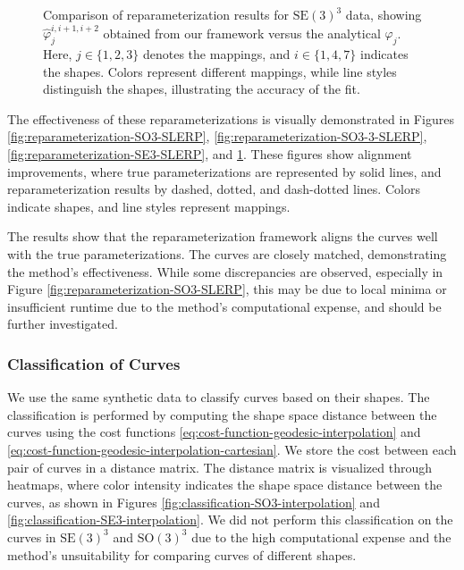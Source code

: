 \begin{figure}[!ht]
    \caption[Reparameterization of Curves in \(\mathrm{SE}(3)^3\)]{Comparison of reparameterization results for \(\mathrm{SE}(3)^3\) data, showing \(\hat{\varphi}_j^{i,i+1,i+2}\) obtained from our framework versus the analytical \(\varphi_j\). Here, \(j \in \{1, 2, 3\}\) denotes the mappings, and \(i \in \{1, 4, 7\}\) indicates the shapes. Colors represent different mappings, while line styles distinguish the shapes, illustrating the accuracy of the fit.}
    \label{fig:reparameterization-SE3-3-SLERP}
\end{figure}

The effectiveness of these reparameterizations is visually demonstrated in Figures \ref{fig:reparameterization-SO3-SLERP}, \ref{fig:reparameterization-SO3-3-SLERP}, \ref{fig:reparameterization-SE3-SLERP}, and \ref{fig:reparameterization-SE3-3-SLERP}. These figures show alignment improvements, where true parameterizations are represented by solid lines, and reparameterization results by dashed, dotted, and dash-dotted lines. Colors indicate shapes, and line styles represent mappings.

The results show that the reparameterization framework aligns the curves well with the true parameterizations. The curves are closely matched, demonstrating the method's effectiveness. While some discrepancies are observed, especially in Figure \ref{fig:reparameterization-SO3-SLERP}, this may be due to local minima or insufficient runtime due to the method's computational expense, and should be further investigated.

\subsubsection{Classification of Curves}
\label{subsubsec:classification-curves}

We use the same synthetic data to classify curves based on their shapes. The classification is performed by computing the shape space distance between the curves using the cost functions \eqref{eq:cost-function-geodesic-interpolation} and \eqref{eq:cost-function-geodesic-interpolation-cartesian}. We store the cost between each pair of curves in a distance matrix. The distance matrix is visualized through heatmaps, where color intensity indicates the shape space distance between the curves, as shown in Figures \ref{fig:classification-SO3-interpolation} and \ref{fig:classification-SE3-interpolation}. We did not perform this classification on the curves in \(\mathrm{SE}(3)^3\) and \(\mathrm{SO}(3)^3\) due to the high computational expense and the method's unsuitability for comparing curves of different shapes.

